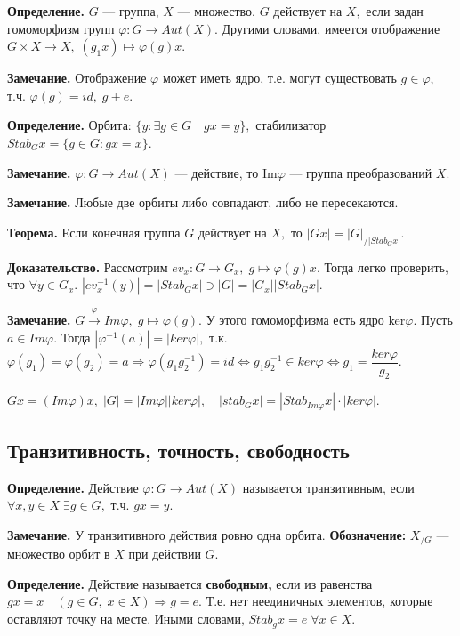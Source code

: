 \documentclass[12pt,a4paper]{article}
\begin{document}
\textbf{Определение.} $G$ --- группа, $X$ --- множество. $G$ действует на $X,$ если задан гомоморфизм групп $\varphi: G \to Aut(X).$ Другими словами, имеется отображение $G \times X \to X, \; (g_{1}x) \mapsto \varphi(g)x.$ 

\textbf{Замечание.} Отображение $\varphi$ может иметь ядро, т.е. могут существовать $g \in \varphi,$ т.ч. $\varphi(g) = id, \; g + e.$ 

\textbf{Определение.} Орбита: $\{y: \exists g \in G \quad gx = y\},$ стабилизатор $Stab_{G}x = \{g \in G: gx = x\}.$ 

\textbf{Замечание.} $\varphi: G \to Aut(X)$ --- действие, то Im$\varphi$ --- группа преобразований $X.$ 

\textbf{Замечание.} Любые две орбиты либо совпадают, либо не пересекаются. 

\textbf{Теорема.} Если конечная группа $G$ действует на $X,$ то $|Gx| = |G|_{/|Stab_{G}x|}.$ 

\textbf{Доказательство.} Рассмотрим $ev_{x}: G \to G_{x}, \; g \mapsto \varphi(g)x.$ Тогда легко проверить, что $\forall y \in G_{x}.$ $|ev_{x}^{-1}(y)| = |Stab_{G}x| \ni |G| = |G_{x}||Stab_{G}x|.$ 

\textbf{Замечание.} $G \overset{\varphi}{\rightarrow} Im \varphi, \; g \mapsto \varphi(g).$ У этого гомоморфизма есть ядро ker$\varphi.$ Пусть $a \in Im \varphi.$ Тогда $|\varphi^{-1}(a)| = |ker \varphi|,$ т.к. $\varphi(g_{1}) = \varphi(g_{2}) = a \Rightarrow \varphi(g_{1}g_{2}^{-1}) = id \Leftrightarrow g_{1}g_{2}^{-1} \in ker \varphi \Leftrightarrow g_{1} = \dfrac{ker\varphi}{g_{2}}.$ 

$Gx = (Im \varphi) x, \; |G| = |Im \varphi| |ker \varphi|, \quad |stab_{G} x| = |Stab_{Im\varphi}x| \cdot |ker \varphi|.$ 

\subsection{Транзитивность, точность, свободность} 

\textbf{Определение.} Действие $\varphi: G \to Aut(X)$ называется транзитивным, если $\forall x, y \in X \; \exists g \in G,$ т.ч. $gx = y.$ 

\textbf{Замечание.} У транзитивного действия ровно одна орбита. \textbf{Обозначение:} $X_{/G}$ --- множество орбит в $X$ при действии $G.$ 

\textbf{Определение.} Действие называется \textbf{свободным,} если из равенства $gx = x \quad (g \in G, \; x \in X) \Rightarrow g = e.$ Т.е. нет неединичных элементов, которые оставляют точку на месте. Иными словами, $Stab_{g}x = e \; \forall x \in X.$ 
\end{document}
